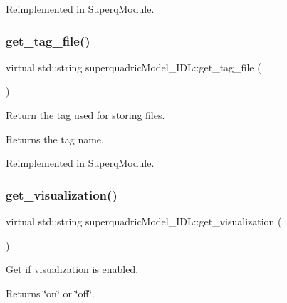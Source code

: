 Reimplemented in \mbox{\hyperlink{classSuperqModule_a66cb1b371b92687d851b5ca23174198b}{Superq\+Module}}.

\mbox{\label{classsuperquadricModel__IDL_a6d39eaa247aec65fe2bfefbdace4ec85}} 
\subsubsection{\texorpdfstring{get\+\_\+tag\+\_\+file()}{get\_tag\_file()}}
{\footnotesize\ttfamily virtual std\+::string superquadric\+Model\+\_\+\+I\+D\+L\+::get\+\_\+tag\+\_\+file (\begin{DoxyParamCaption}{ }\end{DoxyParamCaption})\hspace{0.3cm}{\ttfamily [virtual]}}



Return the tag used for storing files. 

\begin{DoxyReturn}{Returns}
the tag name. 
\end{DoxyReturn}


Reimplemented in \mbox{\hyperlink{classSuperqModule_ac5475155a5a1b05e5fdef54699cef1a6}{Superq\+Module}}.

\mbox{\label{classsuperquadricModel__IDL_a5d9f4f0622ba19b60218636dc108ef61}} 
\subsubsection{\texorpdfstring{get\+\_\+visualization()}{get\_visualization()}}
{\footnotesize\ttfamily virtual std\+::string superquadric\+Model\+\_\+\+I\+D\+L\+::get\+\_\+visualization (\begin{DoxyParamCaption}{ }\end{DoxyParamCaption})\hspace{0.3cm}{\ttfamily [virtual]}}



Get if visualization is enabled. 

\begin{DoxyReturn}{Returns}
\char`\"{}on\char`\"{} or \char`\"{}off\char`\"{}. 
\end{DoxyReturn}


